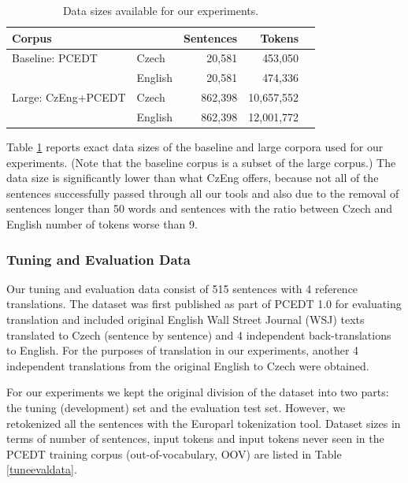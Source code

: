 \documentclass[10pt]{report}
\theoremstyle{plain}
\begin{document}
{{\begin{table}[t]
\begin{center}
\begin{tabular}{llrrr}
Corpus  &    &  Sentences  &  Tokens\\
\hline
Baseline: PCEDT  &  Czech    &  20,581   &  453,050\\
                 &  English  &  20,581   &  474,336\\
\hline
Large: CzEng+PCEDT     &  Czech    &  862,398  &  10,657,552\\
                 &  English  &  862,398  &  12,001,772\\
\end{tabular}
\end{center}
\caption{Data sizes available for our experiments.}
\label{corpsizes}
\end{table}

Table \ref{corpsizes} reports exact data sizes of the baseline and large
corpora used for our experiments. (Note that the baseline corpus is a subset of
the large corpus.) The data size is significantly lower than what CzEng offers,
because not all of the sentences successfully passed through all our tools and
also due to the removal of sentences longer than 50 words and sentences with the ratio
between Czech and English number of tokens worse than 9.






\subsubsection{Tuning and Evaluation Data}
\label{references}


Our tuning and evaluation data consist of 515 sentences
with 4 reference
translations. The dataset was first published as part of PCEDT 1.0 for
evaluating \toen{} translation and included original English Wall Street
Journal (WSJ) texts translated to Czech (sentence by sentence) and 4 independent
back-translations to English. For the purposes of \tocs{} translation in our experiments, another 4
independent translations from the original English to Czech were obtained.

For our experiments we kept the original division of the dataset into two parts: the
tuning (development) set and the evaluation test set.
However, we retokenized all the sentences with the Europarl
tokenization tool. Dataset sizes in terms of number of sentences, input tokens
and input tokens never seen in the PCEDT training corpus (out-of-vocabulary,
OOV) are listed in Table \ref{tuneevaldata}.

}}
\end{document}
